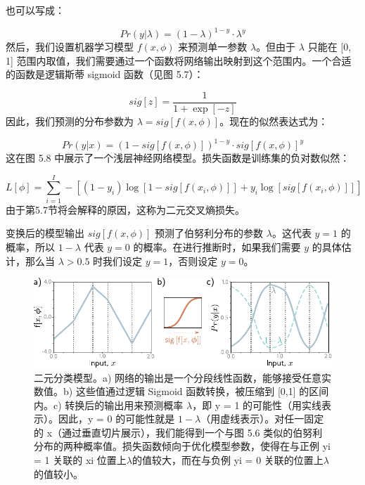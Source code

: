 \documentclass[lang=cn,newtx,10pt,scheme=chinese]{elegantbook}
\begin{document}
也可以写成：

\begin{equation}
Pr(y|\lambda) = (1 - \lambda)^{1-y} \cdot \lambda^y 
\end{equation}
然后，我们设置机器学习模型 \(f(x, \phi)\) 来预测单一参数 \(\lambda\)。但由于 \(\lambda\) 只能在 [0, 1] 范围内取值，我们需要通过一个函数将网络输出映射到这个范围内。一个合适的函数是逻辑斯蒂 sigmoid 函数（见图 5.7）：

\begin{equation}
sig[z] = \frac{1}{1 + \exp[-z]} 
\end{equation}
因此，我们预测的分布参数为 \(\lambda = sig[f(x, \phi)]\)。现在的似然表达式为：

\begin{equation}
Pr(y|x) = (1 - sig[f(x, \phi)])^{1-y} \cdot sig[f(x, \phi)]^y 
\end{equation}
这在图 5.8 中展示了一个浅层神经网络模型。损失函数是训练集的负对数似然：

\begin{equation}
L[\phi] = \sum_{i=1}^{I} -\left[(1 - y_i) \log [1 - sig[f(x_i, \phi)]] + y_i \log [sig[f(x_i, \phi)]]\right] 
\end{equation}
由于第5.7节将会解释的原因，这称为二元交叉熵损失。

变换后的模型输出 \(sig[f(x, \phi)]\) 预测了伯努利分布的参数 \(\lambda\)。这代表 \(y = 1\) 的概率，所以 \(1 - \lambda\) 代表 \(y = 0\) 的概率。在进行推断时，如果我们需要 \(y\) 的具体估计，那么当 \(\lambda > 0.5\) 时我们设定 \(y = 1\)，否则设定 \(y = 0\)。


\begin{figure}[ht!]
	\centering
	\includegraphics[width=0.7\linewidth]{PDFFigures/UDLChap5PDF/LossBinaryClassification.pdf}
	\caption{二元分类模型。a) 网络的输出是一个分段线性函数，能够接受任意实数值。b) 这些值通过逻辑 Sigmoid 函数转换，被压缩到 [0,1] 的区间内。c) 转换后的输出用来预测概率 \(\lambda\)，即 y = 1 的可能性（用实线表示）。因此，y = 0 的可能性就是 \(1 − \lambda\)（用虚线表示）。对任一固定的 x（通过垂直切片展示），我们能得到一个与图 5.6 类似的伯努利分布的两种概率值。损失函数倾向于优化模型参数，使得在与正例 yi = 1 关联的 xi 位置上\(\lambda\)的值较大，而在与负例 yi = 0 关联的位置上\(\lambda\)的值较小。}
\end{figure}
\end{document}

